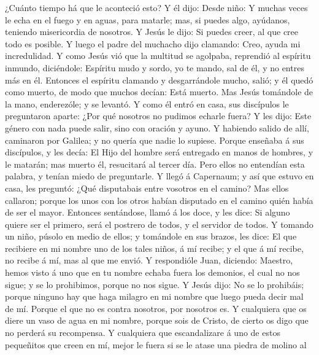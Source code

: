 ¿Cuánto tiempo há que le aconteció esto? Y él dijo: Desde niño:
 Y muchas veces le echa en el fuego y en aguas, para
matarle; mas, si puedes algo, ayúdanos, teniendo misericordia de
nosotros.  Y Jesús le dijo: Si puedes creer, al que cree
todo es posible.  Y luego el padre del muchacho dijo
clamando: Creo, ayuda mi incredulidad.  Y como Jesús vió
que la multitud se agolpaba, reprendió al espíritu inmundo, diciéndole:
Espíritu mudo y sordo, yo te mando, sal de él, y no entres más en él.
 Entonces el espíritu clamando y desgarrándole mucho,
salió; y él quedó como muerto, de modo que muchos decían: Está muerto.
 Mas Jesús tomándole de la mano, enderezóle; y se
levantó.  Y como él entró en casa, sus discípulos le
preguntaron aparte: ¿Por qué nosotros no pudimos echarle fuera?
 Y les dijo: Este género con nada puede salir, sino con
oración y ayuno.  Y habiendo salido de allí, caminaron
por Galilea; y no quería que nadie lo supiese.  Porque
enseñaba á sus discípulos, y les decía: El Hijo del hombre será
entregado en manos de hombres, y le matarán; mas muerto él, resucitará
al tercer día.  Pero ellos no entendían esta palabra, y
tenían miedo de preguntarle.  Y llegó á Capernaum; y así
que estuvo en casa, les preguntó: ¿Qué disputabais entre vosotros en el
camino?  Mas ellos callaron; porque los unos con los
otros habían disputado en el camino quién había de ser el mayor.
 Entonces sentándose, llamó á los doce, y les dice: Si
alguno quiere ser el primero, será el postrero de todos, y el servidor
de todos.  Y tomando un niño, púsolo en medio de ellos; y
tomándole en sus brazos, les dice:  El que recibiere en
mi nombre uno de los tales niños, á mí recibe; y el que á mí recibe, no
recibe á mí, mas al que me envió.  Y respondióle Juan,
diciendo: Maestro, hemos visto á uno que en tu nombre echaba fuera los
demonios, el cual no nos sigue; y se lo prohibimos, porque no nos sigue.
 Y Jesús dijo: No se lo prohibáis; porque ninguno hay que
haga milagro en mi nombre que luego pueda decir mal de mí.
 Porque el que no es contra nosotros, por nosotros es.
 Y cualquiera que os diere un vaso de agua en mi nombre,
porque sois de Cristo, de cierto os digo que no perderá su recompensa.
 Y cualquiera que escandalizare á uno de estos pequeñitos
que creen en mí, mejor le fuera si se le atase una piedra de molino al
